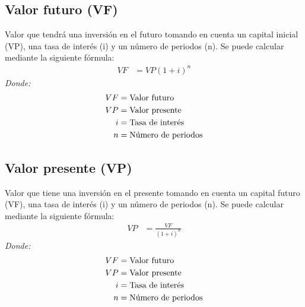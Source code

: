 \documentclass{templateNote}
\begin{document}
\subsection{Valor futuro (VF)}
\noindent Valor que tendrá una inversión en el futuro tomando en cuenta un capital inicial (VP), una tasa de interés (i) y un número de periodos (n). Se puede calcular mediante la siguiente fórmula:
\begin{align*}
    VF &= VP(1 + i)^n
\end{align*}
\textit{Donde:}
\begin{align*}
    VF &= \textnormal{Valor futuro}\\
    VP &= \textnormal{Valor presente}\\
    i &= \textnormal{Tasa de interés}\\
    n &= \textnormal{Número de periodos}\\
\end{align*} 

\subsection{Valor presente (VP)}
\noindent Valor que tiene una inversión en el presente tomando en cuenta un capital futuro (VF), una tasa de interés (i) y un número de periodos (n). Se puede calcular mediante la siguiente fórmula:
\begin{align*}
    VP &= \frac{VF}{(1 + i)^n}
\end{align*}
\textit{Donde:}
\begin{align*}
    VF &= \textnormal{Valor futuro}\\
    VP &= \textnormal{Valor presente}\\
    i &= \textnormal{Tasa de interés}\\
    n &= \textnormal{Número de periodos}\\
\end{align*}
\end{document}
